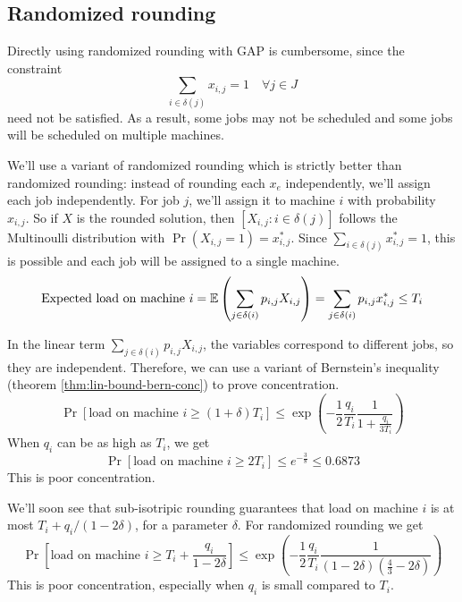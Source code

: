 \subsection{Randomized rounding}

Directly using randomized rounding with GAP is cumbersome, since the constraint
\[ \sum_{i \in \delta(j)} x_{i,j} = 1 \quad \forall j \in J \]
need not be satisfied. As a result, some jobs may not be scheduled
and some jobs will be scheduled on multiple machines.

We'll use a variant of randomized rounding which is strictly better than randomized rounding:
instead of rounding each $x_e$ independently, we'll assign each job independently.
For job $j$, we'll assign it to machine $i$ with probability $x_{i,j}$.
So if $X$ is the rounded solution, then $[X_{i,j}: i \in \delta(j)]$
follows the Multinoulli distribution with $\Pr(X_{i,j} = 1) = x_{i,j}^*$.
Since $\sum_{i \in \delta(j)} x_{i,j}^* = 1$, this is possible and each job
will be assigned to a single machine.
\[ \textrm{Expected load on machine } i
= \operatorname{\mathbb{E}}\left(\sum_{j \in \delta(i)} p_{i,j}X_{i,j}\right)
= \sum_{j \in \delta(i)} p_{i,j}x_{i,j}^*
\le T_i \]

In the linear term $\sum_{j \in \delta(i)} p_{i,j}X_{i,j}$,
the variables correspond to different jobs, so they are independent.
Therefore, we can use a variant of Bernstein's inequality
(theorem \ref{thm:lin-bound-bern-conc}) to prove concentration.
\[ \Pr[\textrm{load on machine } i \ge (1+\delta)T_i]
\le \exp\left( -\frac{1}{2} \frac{q_i}{T_i} \frac{1}{1+\frac{q_i}{3T_i}} \right) \]
When $q_i$ can be as high as $T_i$, we get
\[ \Pr[\textrm{load on machine } i \ge 2T_i]
\le e^{-\frac{3}{8}} \le 0.6873 \]
This is poor concentration.

We'll soon see that sub-isotripic rounding guarantees that load on machine $i$
is at most $T_i + q_i/(1-2\delta)$, for a parameter $\delta$. For randomized rounding we get
\[ \Pr\left[\textrm{load on machine } i \ge T_i + \frac{q_i}{1-2\delta} \right]
\le \exp\left( -\frac{1}{2} \frac{q_i}{T_i} \frac{1}{(1-2\delta)(\frac{4}{3}-2\delta)}\right) \]
This is poor concentration, especially when $q_i$ is small compared to $T_i$.

